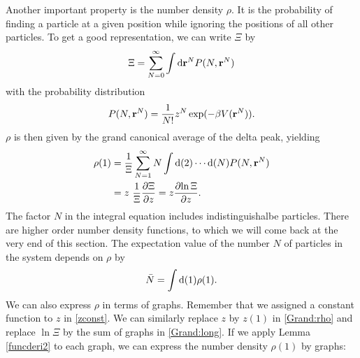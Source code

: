 \documentclass[8.5pt,twoside,twocolumn]{article}
\newcommand\di{\te{d}}
\newcommand\dr{\di\r}
\renewcommand\r{\bo r}
\theoremstyle{standard}
\begin{document}
Another important property is the number density $\rho$. It is the probability
of finding a particle at a given position while ignoring the positions of all
other particles. To get a good representation, we can write $\Xi$ by
\begin{equation}
\Xi = \sum_{N=0}^\infty \int\dr^N P(N,\r^N)
\label{Grand:DifferentXi} 
\end{equation}  
with the probability distribution
\begin{equation}
P(N,\r^N) = \frac 1 {N!} z^N \exp(-\be V(\r^N)). 
\end{equation}
$\rho$ is then given by the grand canonical average of the delta peak, yielding
\begin{equation}
\begin{aligned}
\rho(1) %
&=\frac 1 \Xi \sum_{N=1}^\infty N \int\di(2)\cdots\di(N) P(N,\r^N) \\
&= z \ \frac 1 \Xi \deri \Xi z = z \deri {\ln \Xi} z.
\end{aligned}
\label{Grand:rho}
\end{equation}
The factor $N$ in the integral equation includes indistinguishalbe particles. There are higher order
number density functions, to which we will come back at the very end of this section. The 
expectation value of the number $N$ of particles in the system depends on $\rho$ by
\begin{equation}
\bar N = \int \di(1) \rho(1).
\label{Nbyrho}
\end{equation}
We can also express $\rho$ in terms of graphs. Remember that we assigned a constant function to $z$ in \eqref{zconst}.
We can similarly replace $z$ by $z(1)$ in \eqref{Grand:rho} and replace $\ln \Xi$ by the sum of graphs in \eqref{Grand:long}.
If we apply Lemma \ref{funcderi2} to each graph, we can express the number density $\rho(1)$ by graphs:
\end{document}
